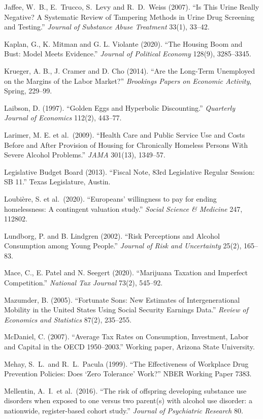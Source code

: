 \documentclass[10pt]{article}
\begin{document}
{\begin{list}{}{\setlength{\leftmargin}{1.5em}\setlength{\itemindent}{-1.5em}\setlength{\itemsep}{0.35em}\setlength{\parsep}{0em}}
\item Jaffee, W.\ B., E.\ Trucco, S.\ Levy and R.\ D.\ Weiss (2007). ``Is This Urine Really Negative? A Systematic Review of Tampering Methods in Urine Drug Screening and Testing.'' \emph{Journal of Substance Abuse Treatment} 33(1), 33--42.
\item Kaplan, G., K. Mitman and G. L. Violante (2020). ``The Housing Boom and Bust: Model Meets Evidence.'' \emph{Journal of Political Economy} 128(9), 3285--3345.
\item Krueger, A. B., J. Cramer and D. Cho (2014). ``Are the Long-Term Unemployed on the Margins of the Labor Market?'' \emph{Brookings Papers on Economic Activity}, Spring, 229--99.
\item Laibson, D. (1997). ``Golden Eggs and Hyperbolic Discounting.'' \emph{Quarterly Journal of Economics} 112(2), 443--77.
\item Larimer, M. E. et al.\ (2009). ``Health Care and Public Service Use and Costs Before and After Provision of Housing for Chronically Homeless Persons With Severe Alcohol Problems.'' \emph{JAMA} 301(13), 1349--57.
\item Legislative Budget Board (2013). ``Fiscal Note, 83rd Legislative Regular Session: SB 11.'' Texas Legislature, Austin.
\item Loubi\`ere, S. et al.\ (2020). ``Europeans' willingness to pay for ending homelessness: A contingent valuation study.'' \emph{Social Science \& Medicine} 247, 112802.
\item Lundborg, P. and B. Lindgren (2002). ``Risk Perceptions and Alcohol Consumption among Young People.'' \emph{Journal of Risk and Uncertainty} 25(2), 165--83.
\item Mace, C., E. Patel and N. Seegert (2020). ``Marijuana Taxation and Imperfect Competition.'' \emph{National Tax Journal} 73(2), 545--92.
\item Mazumder, B. (2005). ``Fortunate Sons: New Estimates of Intergenerational Mobility in the United States Using Social Security Earnings Data.'' \emph{Review of Economics and Statistics} 87(2), 235--255.
\item McDaniel, C. (2007). ``Average Tax Rates on Consumption, Investment, Labor and Capital in the OECD 1950--2003.'' Working paper, Arizona State University.
\item Mehay, S.\ L.\ and R.\ L.\ Pacula (1999). ``The Effectiveness of Workplace Drug Prevention Policies: Does `Zero Tolerance' Work?'' NBER Working Paper 7383.
\item Mellentin, A.\ I.\ et al.\ (2016). ``The risk of offspring developing substance use disorders when exposed to one versus two parent(s) with alcohol use disorder: a nationwide, register-based cohort study.'' \emph{Journal of Psychiatric Research} 80.

\end{list}}
\end{document}
